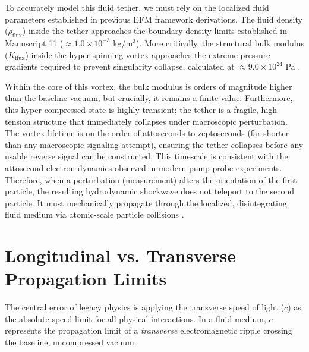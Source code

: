 \documentclass[11pt, a4paper]{article}
\begin{document}
  To accurately model this fluid tether, we must rely on the localized fluid parameters established in previous EFM framework derivations. The fluid density ($\rho_{\text{flux}}$) inside the tether approaches the boundary density limits established in Manuscript 11 ($\approx 1.0 \times 10^{-3}$ kg/m$^3$). More critically, the structural bulk modulus ($K_{\text{flux}}$) inside the hyper-spinning vortex approaches the extreme pressure gradients required to prevent singularity collapse, calculated at $\approx 9.0 \times 10^{24}$ Pa \cite{marabut2026m10}.
  
  Within the core of this vortex, the bulk modulus is orders of magnitude higher than the baseline vacuum, but crucially, it remains a finite value. Furthermore, this hyper-compressed state is highly transient; the tether is a fragile, high-tension structure that immediately collapses under macroscopic perturbation. The vortex lifetime is on the order of attoseconds to zeptoseconds (far shorter than any macroscopic signaling attempt), ensuring the tether collapses before any usable reverse signal can be constructed. This timescale is consistent with the attosecond electron dynamics observed in modern pump-probe experiments. Therefore, when a perturbation (measurement) alters the orientation of the first particle, the resulting hydrodynamic shockwave does not teleport to the second particle. It must mechanically propagate through the localized, disintegrating fluid medium via atomic-scale particle collisions \cite{marabut2026m2, marabut2026m4}.

\clearpage
\section{Longitudinal vs. Transverse Propagation Limits}
  The central error of legacy physics is applying the transverse speed of light ($c$) as the absolute speed limit for all physical interactions. In a fluid medium, $c$ represents the propagation limit of a \textit{transverse} electromagnetic ripple crossing the baseline, uncompressed vacuum. 
  
\end{document}
